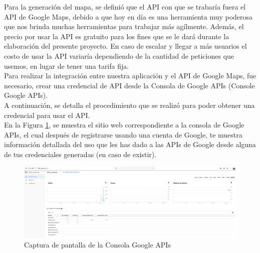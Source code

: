 Para la generación del mapa, se definió que el API con que se trabaría fuera el API de Google Maps, debido a que hoy en día es una herramienta muy poderosa que nos brinda muchas herramientas para trabajar más agílmente. Además, el precio por usar la API es gratuito para los fines que se le dará durante la elaboración del presente proyecto. En caso de escalar y llegar a más usuarios el costo de usar la API variaría dependiendo de la cantidad de peticiones que usemos, en lugar de tener una tarifa fija.\\ Para realizar la integración entre nuestra aplicación y el API de Google Maps, fue necesario, crear una credencial de API desde la Consola de Google APIs (Console Google APIs).\\ A continuación, se detalla el procedimiento que se realizó para poder obtener una credencial para usar el API.\\En la Figura \ref{fig:consola_google}, se muestra el sitio web correspondiente a la consola de Google APIs, el cual después de registrarse usando una cuenta de Google, te muestra información detallada del uso que les has dado a las APIs de Google desde alguna de tus credenciales generadas (en caso de existir). 

\begin{figure}[H]
	\centering
	\includegraphics[scale=.18]{Capitulo5/software/submodulos/aplicacion/images/1}
	\caption{Captura de pantalla de la Consola Google APIs}
	\label{fig:consola_google}
\end{figure}


